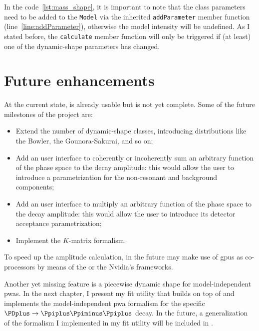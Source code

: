     
    In the code~\ref{lst:mass_shape}, it is important to note that the class parameters need to be added to the \lstinline!Model! via the inherited \lstinline!addParameter! member function (line~\ref{line:addParameter}), otherwise the model intensity will be undefined.
    As I stated before, the \lstinline!calculate! member function will only be triggered if (at least) one of the dynamic-shape parameters has changed.


    \section{Future enhancements}

    At the current state,  is already usable but is not yet complete.
    Some of the future milestones of the project are:
    \begin{itemize}
        \item
            Extend the number of dynamic-shape classes, introducing distributions like the Bowler, the Gounora-Sakurai, and so on;

        \item
            Add an user interface to coherently or incoherently sum an arbitrary function of the phase space to the decay amplitude: this would allow the user to introduce a parametrization for the non-resonant and background components;

        \item
            Add an user interface to multiply an arbitrary function of the phase space to the decay amplitude: this would allow the user to introduce its detector acceptance parametrization;

        \item
            Implement the $K$-matrix formalism.

    \end{itemize}

    To speed up the amplitude calculation, in the future  may make use of \acsp{gpu} as co-processors by means of the  or the Nvidia's  frameworks.


    Another yet missing feature is a piecewise dynamic shape for model-independent \acp{pwa}.
    In the next chapter, I present my fit utility that builds on top of  and implements the model-independent \ac{pwa} formalism for the specific $\PDplus\to\Ppiplus\Ppiminus\Ppiplus$ decay.
    In the future, a generalization of the formalism I implemented in my fit utility will be included in .
